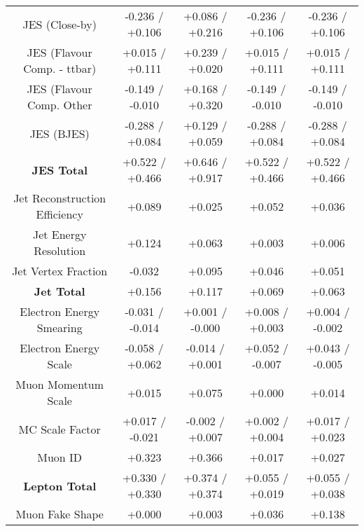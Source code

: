 \begin{table}[htbp]
\begin{center}
\begin{tabular}{|c|c|c|c|c|}
JES (Close-by)                        &-0.236   / +0.106   & +0.086   / +0.216   & -0.236   / +0.106   & -0.236   / +0.106  \\
JES (Flavour Comp. - ttbar)           &+0.015   / +0.111   & +0.239   / +0.020   & +0.015   / +0.111   & +0.015   / +0.111  \\
JES (Flavour Comp. Other              &-0.149   / -0.010   & +0.168   / +0.320   & -0.149   / -0.010   & -0.149   / -0.010  \\
JES (BJES)                            &-0.288   / +0.084   & +0.129   / +0.059   & -0.288   / +0.084   & -0.288   / +0.084  \\
\hline
\textbf{JES Total}                    &+0.522   / +0.466   & +0.646   / +0.917   & +0.522   / +0.466   & +0.522   / +0.466  \\
\hline
Jet Reconstruction Efficiency         &+0.089              & +0.025              & +0.052              & +0.036             \\
Jet Energy Resolution                 &+0.124              & +0.063              & +0.003              & +0.006             \\
Jet Vertex Fraction                   &-0.032              & +0.095              & +0.046              & +0.051             \\
\hline
\textbf{Jet Total}                    &+0.156              & +0.117              & +0.069              & +0.063             \\
\hline
Electron Energy Smearing              &-0.031   / -0.014   & +0.001   / -0.000   & +0.008   / +0.003   & +0.004   / -0.002  \\
Electron Energy Scale                 &-0.058   / +0.062   & -0.014   / +0.001   & +0.052   / -0.007   & +0.043   / -0.005  \\
Muon Momentum Scale                   &+0.015              & +0.075              & +0.000              & +0.014             \\
MC Scale Factor                       &+0.017   / -0.021   & -0.002   / +0.007   & +0.002   / +0.004   & +0.017   / +0.023  \\
Muon ID                               &+0.323              & +0.366              & +0.017              & +0.027             \\
\hline
\textbf{Lepton Total}                 &+0.330   / +0.330   & +0.374   / +0.374   & +0.055   / +0.019   & +0.055   / +0.038  \\
\hline
Muon Fake Shape                       &+0.000              & +0.003              & +0.036              & +0.138             \\

\end{tabular}
\end{center}
\end{table}
